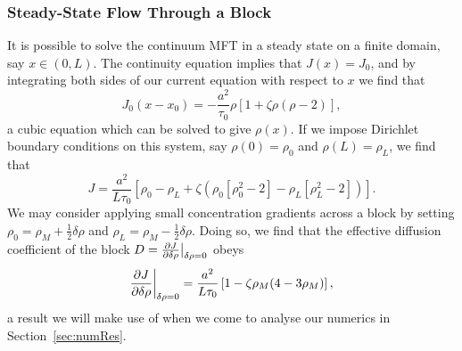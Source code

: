 \subsubsection{Steady-State Flow Through a Block}
It is possible to solve the continuum MFT in a steady state on a finite domain, say $x\in(0, L)$. The continuity equation implies that $J(x)=J_0$, and by integrating both sides of our current equation with respect to $x$ we find that
\begin{equation}
 J_0 (x-x_0) = -\frac{a^2}{\tau_0} \rho \left[1+\zeta \rho\left(\rho-2\right)\right],
\end{equation}
a cubic equation which can be solved to give $\rho(x)$. If we impose Dirichlet boundary conditions on this system, say $\rho(0)=\rho_0$ and $\rho(L)=\rho_L$, we find that
\begin{equation}
 J = \frac{a^2}{L \tau_0} \left[ \rho_0 - \rho_L + \zeta \left( \rho_0\left[\rho_0^2-2\right] - \rho_L\left[\rho_L^2-2\right] \right) \right].
\end{equation}
We may consider applying small concentration gradients across a block by setting $\rho_0 = \rho_M + \frac{1}{2}\delta\rho$ and $\rho_L = \rho_M - \frac{1}{2}\delta\rho$. Doing so, we find that the effective diffusion coefficient of the block
$D=\frac{\partial J}{\partial \delta\rho}\big|_{\delta\rho=0}$ obeys
\begin{equation}
\label{eq:MFTflow}
 \frac{\partial J}{\partial \delta\rho}\bigg|_{\delta\rho=0} = \frac{a^2}{L \tau_0} \left[ 1 - \zeta\rho_M(4-3\rho_M) \right],
\end{equation}
a result we will make use of when we come to analyse our numerics in Section~\ref{sec:numRes}.
